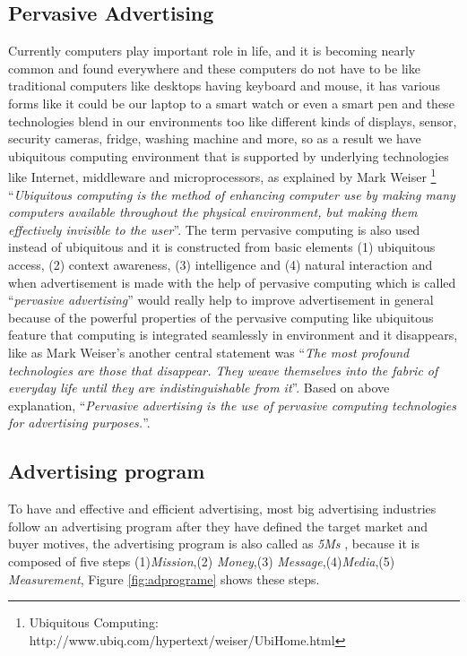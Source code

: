 \subsection{Pervasive Advertising}
Currently computers play important role in life, and it is becoming nearly common and found everywhere and these computers do not have to be like traditional computers like desktops having keyboard and mouse, it has various forms like it could be our laptop to a smart watch or even a smart pen and these technologies blend in our environments too like different kinds of displays, sensor, security cameras, fridge, washing machine and more, so as a result we have ubiquitous computing environment that is supported by underlying technologies like Internet, middleware and microprocessors, as explained by Mark Weiser \footnote{Ubiquitous Computing: http://www.ubiq.com/hypertext/weiser/UbiHome.html}  \cite{ubiquitous_computing} ``\emph{Ubiquitous computing is the method of enhancing computer use by making many computers available throughout the physical environment, but making them effectively invisible to the user}''. The term pervasive computing is also used instead of ubiquitous  \cite{pervasiv_ubiquitous} and it is constructed from basic elements \cite{pervais_ad} (1) ubiquitous access, (2) context awareness, (3) intelligence and (4) natural interaction and when advertisement is made with the help of pervasive computing which is called ``\emph{pervasive advertising}'' would really help to improve advertisement in general because of the powerful properties of the pervasive computing like ubiquitous feature that computing is integrated seamlessly in environment and it disappears, like as Mark Weiser’s \cite{twenty_first} another central statement was ``\emph{The most profound technologies are those that disappear. They weave themselves into the fabric of everyday life until they are indistinguishable from it}''. Based on above explanation, ``\emph{Pervasive advertising is the use of pervasive computing technologies for advertising purposes.}''\cite{pervasiv_ad}.

\subsection{Advertising program}
To have and effective and efficient advertising, most big advertising industries follow an advertising program after they have defined the target market and buyer motives, the advertising program is also called as \emph{5Ms} \cite{adprogram}, because it is composed of five steps (1)\emph{Mission},(2) \emph{Money},(3) \emph{Message},(4)\emph{Media},(5) \emph{Measurement}, Figure \ref{fig:adprograme} shows these steps.


